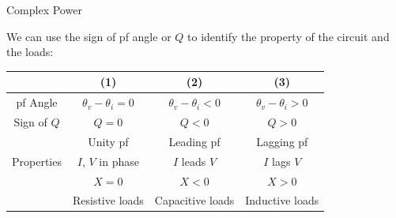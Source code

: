 \documentclass{beamer}
\begin{document}

\begin{frame}{Complex Power}

We can use the sign of pf angle or $Q$ to identify the property of the circuit and the loads:

\begin{table}[]
    \centering
    \begin{tabular}{c|c|c|c}
        \hline
        &(1)&(2)&(3)\\
        \hline
        pf Angle & $\theta_v-\theta_i=0$ & $\theta_v-\theta_i<0$ & $\theta_v-\theta_i>0$  \\ 
        Sign of $Q$ &$Q = 0$ & $Q<0$ & $Q>0$ \\
        \hline
        &Unity pf & Leading pf & Lagging pf \\
        Properties &$I$, $V$ in phase & $I$ leads $V$ & $I$ lags $V$ \\
        &$X = 0$ & $X<0$& $X>0$\\
        &Resistive loads&Capacitive loads&Inductive loads\\
        \hline
        
    \end{tabular}
\end{table}
    
\end{frame}
\end{document}
